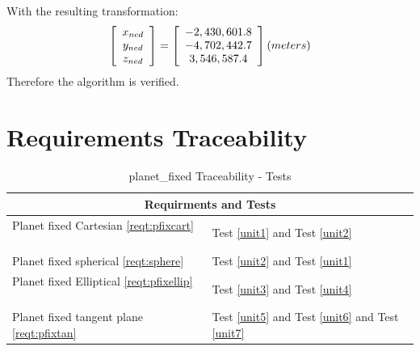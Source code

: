 \documentclass[twoside,11pt,titlepage]{report}
\begin{document}
With the resulting transformation:
\begin{equation}
\left[ {\begin{array}{*{20}c}
   {x_{ned} }  \\
   {y_{ned} }  \\
   {z_{ned} }  \\
\end{array}} \right] = \left[ {\begin{array}{*{20}c}
   { - 2,430,601.8}  \\
   { - 4,702,442.7}  \\
   {3,546,587.4}  \\
\end{array}} \right]\left( {meters} \right)
\end{equation}
Therefore the algorithm is verified.



\chapter{Requirements Traceability}\label{sec:traceability}
\begin{table}[htp]
\centering
\caption{planet\_fixed Traceability - Tests}
\vspace{1ex}
\begin{tabular}{|l|l|}
\hline
\multicolumn{2}{|c|}{Requirments and Tests} \\
\hline
 Planet fixed Cartesian \ref{reqt:pfixcart}  ~& Test \ref{unit1} and Test \ref{unit2} \\
 Planet fixed spherical \ref{reqt:sphere} ~& Test \ref{unit2}  and Test \ref{unit1}\\
 Planet fixed Elliptical \ref{reqt:pfixellip}  ~& Test \ref{unit3}  and Test \ref{unit4}\\
 Planet fixed tangent plane \ref{reqt:pfixtan}  ~& Test \ref{unit5} and Test  \ref{unit6} and Test \ref{unit7} \\
\hline
\end{tabular}
\end{table}


\newpage
\appendix
\appendixpage
\addappheadtotoc
\end{document}
